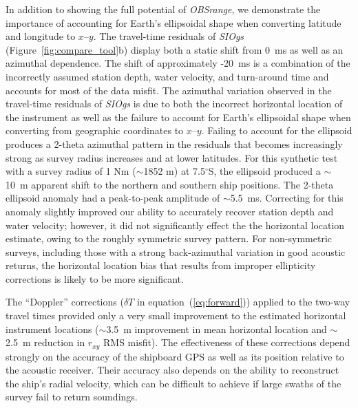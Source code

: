 
In addition to showing the full potential of \textit{OBSrange}, we demonstrate the importance of accounting for Earth's ellipsoidal shape when converting latitude and longitude to $x$--$y$. The travel-time residuals of \textit{SIOgs} (Figure~\ref{fig:compare_tool}b) display both a static shift from 0~ms as well as an azimuthal dependence. The shift of approximately -20~ms is a combination of the incorrectly assumed station depth, water velocity, and turn-around time and accounts for most of the data misfit. The azimuthal variation observed in the travel-time residuals of \textit{SIOgs} is due to both the incorrect horizontal location of the instrument as well as the failure to account for Earth's ellipsoidal shape when converting from geographic coordinates to $x$--$y$. Failing to account for the ellipsoid produces a 2-theta azimuthal pattern in the residuals that becomes increasingly strong as survey radius increases and at lower latitudes. For this synthetic test with a survey radius of 1 Nm ($\sim$1852 m) at 7.5$^{\circ}$S, the ellipsoid produced a $\sim$10~m apparent shift to the northern and southern ship positions. The 2-theta ellipsoid anomaly had a peak-to-peak amplitude of $\sim$5.5~ms. Correcting for this anomaly slightly improved our ability to accurately recover station depth and water velocity; however, it did not significantly effect the the horizontal location estimate, owing to the roughly symmetric survey pattern. For non-symmetric surveys, including those with a strong back-azimuthal variation in good acoustic returns, the horizontal location bias that results from improper ellipticity corrections is likely to be more significant.

The ``Doppler'' corrections ($\delta T$ in equation~(\ref{eq:forward})) applied to the two-way travel times provided only a very small improvement to the estimated horizontal instrument locations ($\sim$3.5~m improvement in mean horizontal location and $\sim$2.5~m reduction in $r_{xy}$ RMS misfit). The effectiveness of these corrections depend strongly on the accuracy of the shipboard GPS as well as its position relative to the acoustic receiver. Their accuracy also depends on the ability to reconstruct the ship's radial velocity, which can be difficult to achieve if large swaths of the survey fail to return soundings.


